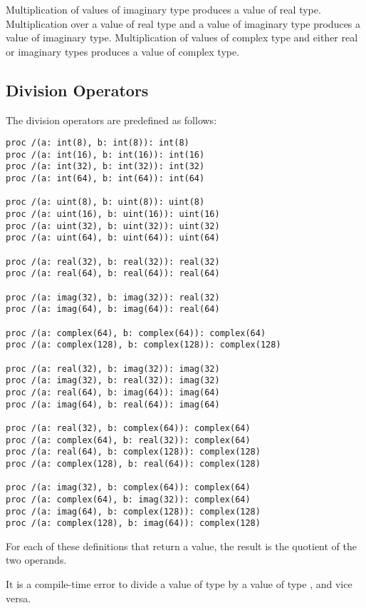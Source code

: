 Multiplication of values of imaginary type produces a value of real
type.  Multiplication over a value of real type and a value of
imaginary type produces a value of imaginary type.  Multiplication of
values of complex type and either real or imaginary types produces a
value of complex type.

\pagebreak
\subsection{Division Operators}
\label{Division_Operators}

The division operators are predefined as follows:
\begin{chapel}
\begin{verbatim}
proc /(a: int(8), b: int(8)): int(8)
proc /(a: int(16), b: int(16)): int(16)
proc /(a: int(32), b: int(32)): int(32)
proc /(a: int(64), b: int(64)): int(64)

proc /(a: uint(8), b: uint(8)): uint(8)
proc /(a: uint(16), b: uint(16)): uint(16)
proc /(a: uint(32), b: uint(32)): uint(32)
proc /(a: uint(64), b: uint(64)): uint(64)

proc /(a: real(32), b: real(32)): real(32)
proc /(a: real(64), b: real(64)): real(64)

proc /(a: imag(32), b: imag(32)): real(32)
proc /(a: imag(64), b: imag(64)): real(64)

proc /(a: complex(64), b: complex(64)): complex(64)
proc /(a: complex(128), b: complex(128)): complex(128)

proc /(a: real(32), b: imag(32)): imag(32)
proc /(a: imag(32), b: real(32)): imag(32)
proc /(a: real(64), b: imag(64)): imag(64)
proc /(a: imag(64), b: real(64)): imag(64)

proc /(a: real(32), b: complex(64)): complex(64)
proc /(a: complex(64), b: real(32)): complex(64)
proc /(a: real(64), b: complex(128)): complex(128)
proc /(a: complex(128), b: real(64)): complex(128)

proc /(a: imag(32), b: complex(64)): complex(64)
proc /(a: complex(64), b: imag(32)): complex(64)
proc /(a: imag(64), b: complex(128)): complex(128)
proc /(a: complex(128), b: imag(64)): complex(128)
\end{verbatim}
\end{chapel}
For each of these definitions that return a value, the result is the
quotient of the two operands.

It is a compile-time error to divide a value of type  by
a value of type , and vice versa.

